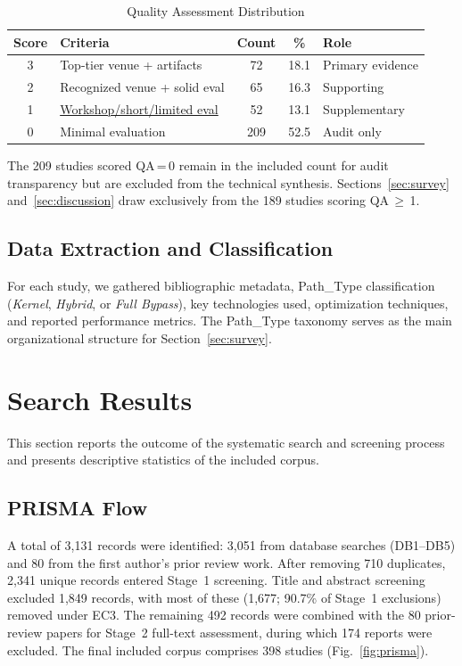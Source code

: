 \documentclass[conference]{IEEEtran}
\begin{document}
\begin{table}[t]
\caption{Quality Assessment Distribution}
\label{tab:qa}
\centering
\small
\begin{tabularx}{\columnwidth}{c X c c X}
\toprule
Score & Criteria & Count & \% & Role \\
\midrule
3 & Top-tier venue + artifacts & 72 & 18.1 & Primary evidence \\
2 & Recognized venue + solid eval & 65 & 16.3 & Supporting \\
1 & \url{Workshop/short/limited eval} & 52 & 13.1 & Supplementary \\
0 & Minimal evaluation & 209 & 52.5 & Audit only \\
\bottomrule
\end{tabularx}
\end{table}

The 209 studies scored QA\,=\,0 remain in the included count for audit transparency but are excluded from the technical synthesis. Sections~\ref{sec:survey} and~\ref{sec:discussion} draw exclusively from the 189 studies scoring QA\,$\geq$\,1.

\subsection{Data Extraction and Classification}

For each study, we gathered bibliographic metadata, Path\_Type classification (\emph{Kernel}, \emph{Hybrid}, or \emph{Full Bypass}), key technologies used, optimization techniques, and reported performance metrics. The Path\_Type taxonomy serves as the main organizational structure for Section~\ref{sec:survey}.

\section{Search Results}
\label{sec:results}

This section reports the outcome of the systematic search and screening process and presents descriptive statistics of the included corpus.

\subsection{PRISMA Flow}

A total of 3{,}131 records were identified: 3{,}051 from database searches (DB1--DB5) and 80 from the first author's prior review work. After removing 710 duplicates, 2{,}341 unique records entered Stage~1 screening. Title and abstract screening excluded 1{,}849 records, with most of these (1{,}677; 90.7\% of Stage~1 exclusions) removed under EC3. The remaining 492 records were combined with the 80 prior-review papers for Stage~2 full-text assessment, during which 174 reports were excluded. The final included corpus comprises 398 studies (Fig.~\ref{fig:prisma}).
\end{document}
